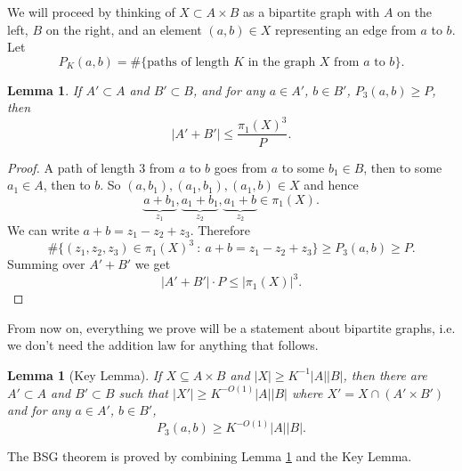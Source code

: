 \documentclass[12pt]{amsart}
\newtheorem{lemma}[theorem]{Lemma}
\begin{document}
We will proceed by thinking of $X \subset A \times B$ as a bipartite graph with $A$ on the left, $B$ on the right, and an element $(a, b) \in X$ representing an edge from $a$ to $b$. Let
\[
    P_K(a, b) = \# \{ \text{paths of length } K \text{ in the graph } X \text{ from } a \text{ to } b \}.
\]
\begin{lemma}
    \label{lem:bsg_additive_lemma}
    If $A' \subset A$ and $B' \subset B$, and for any $a \in A'$, $b \in B'$, $P_3(a, b) \geq P$, then
    \[
        |A' + B'| \leq \frac{\pi_1(X)^3}{P}.
    \]
\end{lemma}
\begin{proof}
    A path of length $3$ from $a$ to $b$ goes from $a$ to some $b_1 \in B$, then to some $a_1 \in A$, then to $b$. So $(a, b_1), (a_1, b_1), (a_1, b) \in X$ and hence
    \[
        \underbrace{a + b_1}_{z_1}, \underbrace{a_1 + b_1}_{z_2}, \underbrace{a_1 + b}_{z_2} \in \pi_1(X).
    \]
    We can write $a + b = z_1 - z_2 + z_3$. Therefore
    \[
        \# \{ (z_1, z_2, z_3) \in \pi_1(X)^3 \ : \ a + b = z_1 - z_2 + z_3 \} \geq P_3(a, b) \geq P.
    \]
    Summing over $A' + B'$ we get
    \[
        |A' + B'| \cdot P \leq |\pi_1(X)|^3.
    \]
\end{proof}
From now on, everything we prove will be a statement about bipartite graphs, i.e. we don't need the addition law for anything that follows.
\begin{lemma}[Key Lemma]
    If $X \subseteq A \times B$ and $|X| \geq K^{-1} |A| |B|$, then there are $A' \subset A$ and $B' \subset B$ such that $|X'| \geq K^{-O(1)} |A||B|$ where $X' = X \cap (A' \times B')$ and for any $a \in A'$, $b \in B'$,
    \[
        P_3(a, b) \geq K^{-O(1)} |A||B|.
    \]
\end{lemma}
The BSG theorem is proved by combining Lemma \ref{lem:bsg_additive_lemma} and the Key Lemma.
\end{document}
